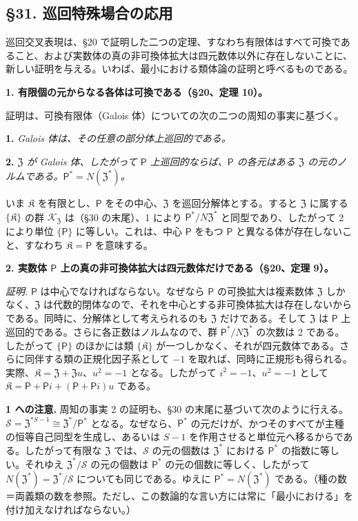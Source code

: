 \subsection*{\S 31. 巡回特殊場合の応用}\label{anwendungen-des-zyklischen-spezialfalles}

巡回交叉表現は、\S 20 で証明した二つの定理、すなわち有限体はすべて可換であること、および実数体の真の非可換体拡大は四元数体以外に存在しないことに、新しい証明を与える。いわば、最小における類体論の証明と呼べるものである。

\noindent\textbf{1. 有限個の元からなる各体は可換である（\S 20、定理 10）。}

証明は、可換有限体（Galois 体）についての次の二つの周知の事実に基づく。

\noindent\textbf{1.} \emph{Galois 体は、その任意の部分体上巡回的である。}

\noindent\textbf{2.} \emph{\(\mathfrak Z\) が Galois 体、したがって \(\mathsf P\) 上巡回的ならば、\(\mathsf P\) の各元はある \(\mathfrak Z\) の元のノルムである。\(\mathsf P^*=N(\mathfrak Z^*)\)。}

いま \(\mathfrak K\) を有限とし、\(\mathsf P\) をその中心、\(\mathfrak Z\) を巡回分解体とする。すると \(\mathfrak Z\) に属する \(\{\mathfrak K\}\) の群 \(\mathscr K_{\mathfrak Z}\) は（\S 30 の末尾）、1 により \(\mathsf P^*/N\mathfrak Z^*\) と同型であり、したがって 2 により単位 \(\{\mathsf P\}\) に等しい。これは、中心 \(\mathsf P\) をもつ \(\mathsf P\) と異なる体が存在しないこと、すなわち \(\mathfrak K=\mathsf P\) を意味する。

\noindent\textbf{2. 実数体 \(\mathsf P\) 上の真の非可換体拡大は四元数体だけである（\S 20、定理 9）。}

\noindent\emph{証明.} \(\mathsf P\) は中心でなければならない。なぜなら \(\mathsf P\) の可換拡大は複素数体 \(\mathfrak Z\) しかなく、\(\mathfrak Z\) は代数的閉体なので、それを中心とする非可換体拡大は存在しないからである。同時に、分解体として考えられるのも \(\mathfrak Z\) だけである。そして \(\mathfrak Z\) は \(\mathsf P\) 上巡回的である。さらに各正数はノルムなので、群 \(\mathsf P^*/N\mathfrak Z^*\) の次数は 2 である。したがって \(\{\mathsf P\}\) のほかには類 \(\{\mathfrak K\}\) が一つしかなく、それが四元数体である。さらに同伴する類の正規化因子系として \(-1\) を取れば、同時に正規形も得られる。実際、\(\mathfrak K=\mathfrak Z+\mathfrak Zu\)、\(u^2=-1\) となる。したがって \(i^2=-1\)、\(u^2=-1\) として \(\mathfrak K=\mathsf P+\mathsf Pi+(\mathsf P+\mathsf Pi)u\) である。

\noindent\textbf{1 への注意.} 周知の事実 2 の証明も、\S 30 の末尾に基づいて次のように行える。\(\mathscr S=\mathfrak Z^{*S-1}\cong\mathfrak Z^*/\mathsf P^*\) となる。なぜなら、\(\mathsf P^*\) の元だけが、かつそのすべてが主種の恒等自己同型を生成し、あるいは \(S-1\) を作用させると単位元へ移るからである。したがって有限な \(\mathfrak Z\) では、\(\mathscr S\) の元の個数は \(\mathfrak Z^*\) における \(\mathsf P^*\) の指数に等しい。それゆえ \(\mathfrak Z^*/\mathscr S\) の元の個数は \(\mathsf P^*\) の元の個数に等しく、したがって \(N(\mathfrak Z^*)=\mathfrak Z^*/\mathscr S\) についても同じである。ゆえに \(\mathsf P^*=N(\mathfrak Z^*)\) である。（種の数＝両義類の数を参照。ただし、この数論的な言い方には常に「最小における」を付け加えなければならない。）

